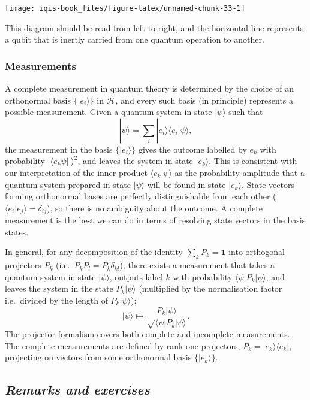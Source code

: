 \documentclass[fleqn]{article}
\begin{document}
\begin{center}\texttt{[image: iqis-book\_files/figure-latex/unnamed-chunk-33-1]} \end{center}

This diagram should be read from left to right, and the horizontal line represents a qubit that is inertly carried from one quantum operation to another.

\hypertarget{measurements}{%
\subsubsection{Measurements}\label{measurements}}

A complete measurement in quantum theory is determined by the choice of an orthonormal basis \(\{|e_i\rangle\}\) in \(\mathcal{H}\), and every such basis (in principle) represents a possible measurement.
Given a quantum system in state \(|\psi\rangle\) such that
\[
  |\psi\rangle = \sum_i |e_i\rangle\langle e_i|\psi\rangle,
\]
the measurement in the basis \(\{|e_i\rangle\}\) gives the outcome labelled by \(e_k\) with probability \(|\langle e_k\psi||\rangle^2\), and leaves the system in state \(|e_k\rangle\).
This is consistent with our interpretation of the inner product \(\langle e_k|\psi\rangle\) as the probability amplitude that a quantum system prepared in state \(|\psi\rangle\) will be found in state \(|e_k\rangle\).
State vectors forming orthonormal bases are perfectly distinguishable from each other (\(\langle e_i|e_j\rangle=\delta_{ij}\)), so there is no ambiguity about the outcome.
A complete measurement is the best we can do in terms of resolving state vectors in the basis states.

In general, for any decomposition of the identity \(\sum_k P_k=\mathbf{1}\) into orthogonal projectors \(P_k\) (i.e.~\(P_kP_l = P_k\delta_{kl}\)), there exists a measurement that takes a quantum system in state \(|\psi\rangle\), outputs label \(k\) with probability \(\langle\psi|P_k|\psi\rangle\), and leaves the system in the state \(P_k|\psi\rangle\) (multiplied by the normalisation factor i.e.~divided by the length of \(P_k|\psi\rangle\)):
\[
  |\psi\rangle
  \mapsto
  \frac{P_k|\psi\rangle}{\sqrt{\langle\psi|P_k|\psi\rangle}}.
\]
The projector formalism covers both complete and incomplete measurements.
The complete measurements are defined by rank one projectors, \(P_k=|e_k\rangle\langle e_k|\), projecting on vectors from some orthonormal basis \(\{|e_k\rangle\}\).

\hypertarget{remarks-and-exercises-3}{%
\subsection{\texorpdfstring{\emph{Remarks and exercises}}{Remarks and exercises}}\label{remarks-and-exercises-3}}
\end{document}
